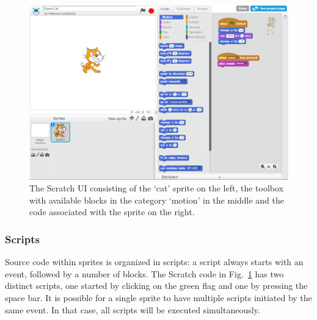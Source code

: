 \documentclass[conference]{IEEEtran}
\begin{document}
\begin{figure}[tb]
  \begin{center}
  \includegraphics[width=\columnwidth]{fig/ui.png}
  \caption{The Scratch UI consisting of the `cat' sprite on the left, the toolbox with available blocks in the category `motion' in the middle and the code associated with the sprite on the right.}
  \label{fig:ui}
  \end{center}
\end{figure} 


\subsubsection{Scripts}
Source code within sprites is organized in scripts: a script always starts with an event, followed by a number of blocks. The Scratch code in Fig.~\ref{fig:ui} has two distinct scripts, one started by clicking on the green flag and one by pressing the space bar. It is possible for a single sprite to have multiple scripts initiated by the same event. In that case, all scripts will be executed simultaneously. 
\end{document}
